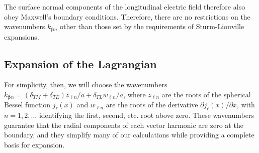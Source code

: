 \documentclass{article}
\begin{document}
The surface normal components of the longitudinal electric field therefore also obey Maxwell's boundary conditions. Therefore, there are no restrictions on the wavenumbers $k_{\bm{\beta}n}$ other than those set by the requirements of Sturm-Liouville expansions.











\subsection{Expansion of the Lagrangian}

For simplicity, then, we will choose the wavenumbers $k_{\bm{\beta}n} = (\delta_{TM} + \delta_{TE})z_{\ell n}/a + \delta_{TL}w_{\ell n}/a$, where $z_{\ell n}$ are the roots of the spherical Bessel function $j_\ell(x)$ and $w_{\ell n}$ are the roots of the derivative $\partial j_\ell(x)/\partial x$, with $n = 1,2,\ldots$ identifying the first, second, etc. root above zero. These wavenumbers guarantee that the radial components of each vector harmonic are zero at the boundary, and they simplify many of our calculations while providing a complete basis for expansion.
\end{document}
